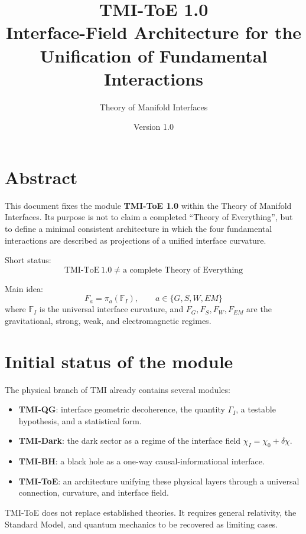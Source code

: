 \documentclass[12pt,a4paper]{article}
\title{TMI-ToE 1.0\\\large Interface-Field Architecture for the Unification of Fundamental Interactions}
\author{Theory of Manifold Interfaces}
\date{Version 1.0}
\begin{document}
\maketitle
\tableofcontents
\newpage

\section*{Abstract}

This document fixes the module \textbf{TMI-ToE 1.0} within the Theory of Manifold Interfaces. Its purpose is not to claim a completed ``Theory of Everything'', but to define a minimal consistent architecture in which the four fundamental interactions are described as projections of a unified interface curvature.

Short status:
\[
\boxed{\mathrm{TMI\mbox{-}ToE\ 1.0}\neq \text{a complete Theory of Everything}}
\]
\begin{center}
\end{center}

Main idea:
\[
\boxed{F_a=\pi_a(\mathbb F_I),\qquad a\in\{G,S,W,EM\}}
\]
where $\mathbb F_I$ is the universal interface curvature, and $F_G,F_S,F_W,F_{EM}$ are the gravitational, strong, weak, and electromagnetic regimes.

\section{Initial status of the module}

The physical branch of TMI already contains several modules:
\begin{itemize}
  \item \textbf{TMI-QG}: interface geometric decoherence, the quantity $\Gamma_I$, a testable hypothesis, and a statistical form.
  \item \textbf{TMI-Dark}: the dark sector as a regime of the interface field $\chi_I=\chi_0+\delta\chi$.
  \item \textbf{TMI-BH}: a black hole as a one-way causal-informational interface.
  \item \textbf{TMI-ToE}: an architecture unifying these physical layers through a universal connection, curvature, and interface field.
\end{itemize}

TMI-ToE does not replace established theories. It requires general relativity, the Standard Model, and quantum mechanics to be recovered as limiting cases.
\end{document}
